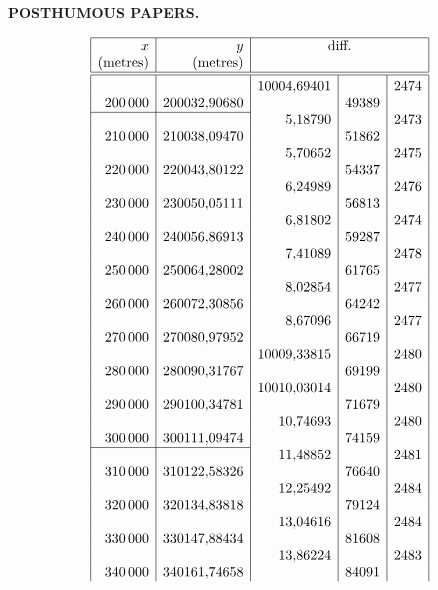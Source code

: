 \par\clearpage
{}\hfill{\small\textbf{POSTHUMOUS PAPERS.}}\hfill\null\par\medskip
{\footnotesize\renewcommand{\arraystretch}{.63}
\[\begin{array}{|r|r|r|r|r|}\hline
\rule{0pt}{2ex}x&y&\multicolumn{3}{c|}{\text{diff.}}\\
\rule[-3.6pt]{0pt}{3.6pt}\text{(metres)}&\text{(metres)}&\multicolumn{3}{c|}{}\\\hline\hline
\rule{0pt}{2.5ex}&&10004{,}69401&&2474\\
200\,000&200032{,}90680&&49389&\\
\cline{1-2}
&&5{,}18790&&2473\\
210\,000&210038{,}09470&&51862&\\
&&5{,}70652&&2475\\
220\,000&220043{,}80122&&54337&\\
&&6{,}24989&&2476\\
230\,000&230050{,}05111&&56813&\\
&&6{,}81802&&2474\\
240\,000&240056{,}86913&&59287&\\
&&7{,}41089&&2478\\
250\,000&250064{,}28002&&61765&\\
&&8{,}02854&&2477\\
260\,000&260072{,}30856&&64242&\\
&&8{,}67096&&2477\\
270\,000&270080{,}97952&&66719&\\
&&10009{,}33815&&2480\\
280\,000&280090{,}31767&&69199&\\
&&10010{,}03014&&2480\\
290\,000&290100{,}34781&&71679&\\
&&10{,}74693&&2480\\
300\,000&300111{,}09474&&74159&\\
\cline{1-2}
&&11{,}48852&&2481\\
310\,000&310122{,}58326&&76640&\\
&&12{,}25492&&2484\\
320\,000&320134{,}83818&&79124&\\
&&13{,}04616&&2484\\
330\,000&330147{,}88434&&81608&\\
&&13{,}86224&&2483\\
340\,000&340161{,}74658&&84091&\\

\end{array}\]}
